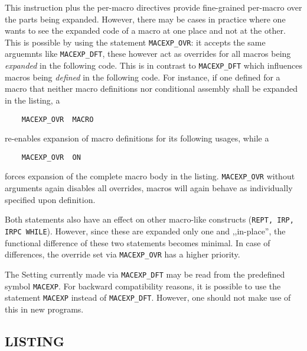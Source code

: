 \documentclass[12pt,twoside]{report}
\makeatletter
\newcommand{\tty}[1]{{\tt #1}}
\newcommand{\ttindex}[1]{\index{#1@{\tt #1}}}
\makeatother
\begin{document}
\par
This instruction plus the per-macro directives provide fine-grained
per-macro over the parts being expanded.  However, there may be cases
in practice where one wants to see the expanded code of a macro at
one place and not at the other.  This is possible by using the
statement \tty{MACEXP\_OVR}: it accepts the same arguemnts like
\tty{MACEXP\_DFT}, these however act as overrides for all macros being
{\em expanded} in the following code.  This is in contrast to
\tty{MACEXP\_DFT} which influences macros being {\em defined} in the
following code.  For instance, if one defined for a macro that
neither macro definitions nor conditional assembly shall be expanded
in the listing, a
\begin{verbatim}
	MACEXP_OVR  MACRO
\end{verbatim}
re-enables expansion of macro definitions for its following usages,
while a
\begin{verbatim}
	MACEXP_OVR  ON
\end{verbatim}
forces expansion of the complete macro body in the listing.
\tty{MACEXP\_OVR} without arguments again disables all overrides,
macros will again behave as individually specified upon definition.
\par
Both statements also have an effect on other macro-like constructs
(\tty{REPT, IRP, IRPC WHILE}).  However, since these are expanded
only one and ,,in-place'', the functional difference of these two
statements becomes minimal.  In case of differences, the override set
via \tty{MACEXP\_OVR} has a higher priority.

The Setting currently made via \tty{MACEXP\_DFT} may be read from the
predefined symbol \tty{MACEXP}.  For backward compatibility reasons,
it is possible to use the statement \tty{MACEXP} instead of
\tty{MACEXP\_DFT}.  However, one should not make use of this in new
programs.


\subsection{LISTING}
\ttindex{LISTING}
\end{document}
